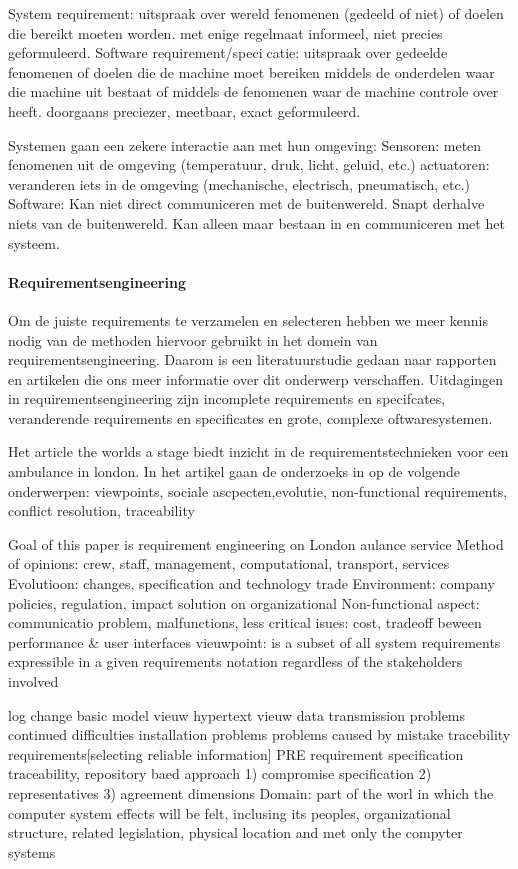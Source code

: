 System requirement:
uitspraak over wereld fenomenen (gedeeld of niet) of doelen
die bereikt moeten worden.
met enige regelmaat informeel, niet precies geformuleerd.
Software requirement/specicatie:
uitspraak over gedeelde fenomenen of doelen die de machine
moet bereiken middels de onderdelen waar die machine uit
bestaat of middels de fenomenen waar de machine controle
over heeft.
doorgaans preciezer, meetbaar, exact geformuleerd.


Systemen gaan een zekere interactie aan met hun omgeving:
Sensoren: meten fenomenen uit de omgeving (temperatuur,
druk, licht, geluid, etc.)
actuatoren: veranderen iets in de omgeving (mechanische,
electrisch, pneumatisch, etc.)
Software:
Kan niet direct communiceren met de buitenwereld.
Snapt derhalve niets van de buitenwereld.
Kan alleen maar bestaan in en communiceren met het
systeem.


\paragraph{Requirementsengineering}

Om de juiste requirements te verzamelen en selecteren hebben we meer kennis nodig van de methoden hiervoor gebruikt in het domein van requirementsengineering. Daarom is een literatuurstudie gedaan naar rapporten en artikelen die ons meer informatie over dit onderwerp verschaffen.
 Uitdagingen in requirementsengineering zijn incomplete requirements en specifcates, veranderende requirements en specificates en grote, complexe oftwaresystemen.
 
 Het article the worlds a stage biedt inzicht in de requirementstechnieken voor een ambulance in london. In het artikel gaan de onderzoeks in op de volgende onderwerpen: 
 viewpoints, sociale ascpecten,evolutie, non-functional requirements, conflict resolution, traceability
 
 Goal of this paper is requirement  engineering on London aulance service
 Method of opinions: crew, staff, management, computational, transport, services
 Evolutioon: changes, specification and technology trade
 Environment: company policies, regulation, impact solution on organizational
 Non-functional aspect: communicatio problem, malfunctions, less critical isues: cost, tradeoff beween performance \& user interfaces
 vieuwpoint: is a subset of all system requirements expressible in a given requirements notation regardless of the stakeholders involved
 
 log change
 basic model vieuw
 hypertext vieuw
 data transmission problems
 continued difficulties
 installation problems
 problems caused by mistake
 tracebility requirements[selecting reliable information]
 PRE requirement specification traceability, repository baed approach
 1) compromise specification
 2) representatives
 3) agreement dimensions
 Domain: part of the worl in which the computer system effects will be felt, inclusing its peoples, organizational structure, related legislation, physical location and met only the compyter systems
 
